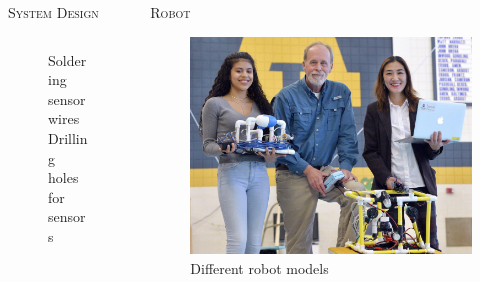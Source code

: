 \documentclass[final,t]{beamer}
\begin{document}
\begin{frame}{}
\begin{columns}
\begin{column}{.5\linewidth}
\begin{block}{\textsc{System Design}}
\begin{center}
\begin{figure}
\begin{tabular}{cc}
                    \end{tabular}
                    \caption{Soldering sensor wires \hspace{30mm} Drilling holes for sensors}
                    \end{figure}
                    \end{center}
  
                    \vspace*{6mm}
                \end{block}
            \end{column}

            \begin{column}{.5\linewidth}

                \begin{block}{\textsc{Robot}}
                    \vspace*{6mm}
                    \begin{figure}
                        \includegraphics[scale = 0.5]{assets/group_pic.jpg}
                        \caption{Different robot models}
                    \end{figure}
                \end{block}


\end{column}
\end{columns}
\end{frame}
\end{document}
